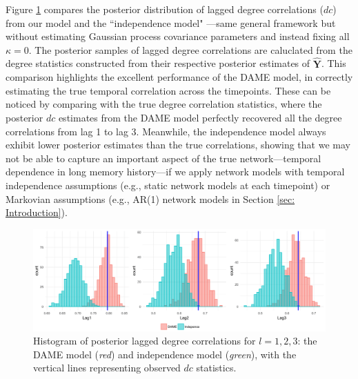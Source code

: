 \documentclass[a4paper]{article}
\begin{document}
 Figure \ref{figure:correlationstudy} compares the posterior distribution of lagged degree correlations ($dc$) from our model and the ``independence model" ---same general framework but without estimating Gaussian process covariance parameters and instead fixing all $\kappa = 0$. The posterior samples of lagged degree correlations are caluclated from the degree statistics constructed from their respective posterior estimates of $\hat{\mathbf{Y}}$. This comparison highlights the excellent performance of the DAME model, in correctly estimating the true temporal correlation across the timepoints. These can be noticed by comparing with the true degree correlation statistics, where the posterior $dc$ estimates from the DAME model perfectly recovered all the degree correlations from lag 1 to lag 3. Meanwhile, the independence model always exhibit lower posterior estimates than the true correlations, showing that we may not be able to capture an important aspect of the true network---temporal dependence in long memory history---if we apply network models with temporal independence assumptions (e.g., static network models at each timepoint) or Markovian assumptions (e.g., AR(1) network models in Section \ref{sec: Introduction}).
\begin{figure}[ht]
	\centering
		\includegraphics[width=1\textwidth]{plots_paper/correlations-1.png}	
	\caption {Histogram of posterior lagged degree correlations for $l=1,2,3$: the DAME model (\textit{red}) and independence model (\textit{green}), with the vertical lines representing observed $dc$ statistics.}
	\label{figure:correlationstudy}
\end{figure}
\end{document}
